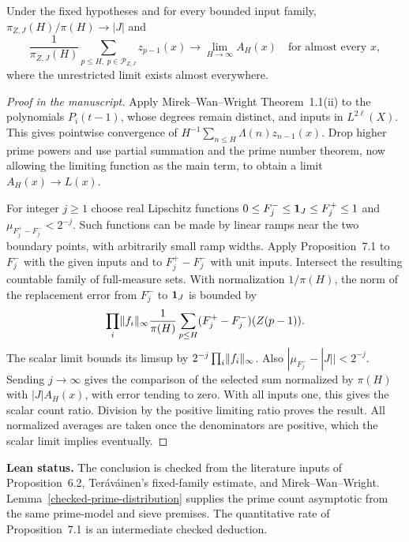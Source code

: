 \begin{theorem}\label{t:pointwise}
\leanok
{}
Under the fixed hypotheses and for every bounded input family,
$\pi_{Z,J}(H)/\pi(H)\to|J|$ and
\[
 \frac1{\pi_{Z,J}(H)}
   \sum_{p\le H,\ p\in\mathcal P_{Z,J}}z_{p-1}(x)
 \longrightarrow \lim_{H\to\infty} A_H(x)
 \quad\text{for almost every }x ,
\]
where the unrestricted limit exists almost everywhere.
\end{theorem}
\begin{proof}[Proof in the manuscript]
\leanok
Apply Mirek--Wan--Wright Theorem~1.1(ii) to the polynomials
$P_i(t-1)$, whose degrees remain distinct, and inputs in
$L^{2\ell}(X)$. This gives pointwise convergence of
$H^{-1}\sum_{n\le H}\Lambda(n)z_{n-1}(x)$.
Drop higher prime powers and use partial summation and the prime
number theorem, now allowing the limiting function as the main
term, to obtain a limit $A_H(x)\to L(x)$.

For integer $j\ge1$ choose real Lipschitz functions
$0\le F_j^-\le\mathbf 1_J\le F_j^+\le1$ and
$\mu_{F_j^+-F_j^-}<2^{-j}$. Such functions can be made
by linear ramps near the two boundary points, with
arbitrarily small ramp widths. Apply Proposition~7.1 to $F_j^-$
with the given inputs and to $F_j^+-F_j^-$ with unit inputs.
Intersect the resulting countable family of full-measure sets.
With normalization $1/\pi(H)$, the norm of the replacement
error from $F_j^-$ to $\mathbf 1_J$ is bounded by
\[
 \prod_i\lVert f_i\rVert_\infty
  \frac1{\pi(H)}\sum_{p\le H}(F_j^+-F_j^-)(Z(p-1)).
\]
The scalar limit bounds its limsup by
$2^{-j}\prod_i\lVert f_i\rVert_\infty$. Also
$|\mu_{F_j^-}-|J||<2^{-j}$. Sending $j\to\infty$ gives
the comparison of the selected sum normalized by $\pi(H)$
with $|J|A_H(x)$, with error tending to zero. With all
inputs one, this gives the scalar count ratio.
Division by the positive limiting ratio proves the result.
All normalized averages are taken once the denominators are
positive, which the scalar limit implies eventually.
\end{proof}
\noindent\textbf{Lean status.} The conclusion is checked from
the literature inputs of Proposition~6.2, Ter\'av\'ainen's fixed-family
estimate, and Mirek--Wan--Wright. Lemma~\ref{checked-prime-distribution}
supplies the prime count asymptotic from the same prime-model and
sieve premises. The quantitative rate of Proposition~7.1 is an
intermediate checked deduction.

